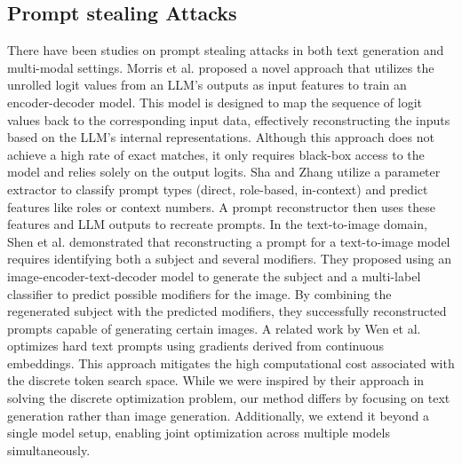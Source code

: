 \subsection{Prompt stealing Attacks}
There have been studies on prompt stealing attacks in both text generation and multi-modal settings. Morris et al. \cite{morris_language_nodate} proposed a novel approach that utilizes the unrolled logit values from an LLM's outputs as input features to train an encoder-decoder model. This model is designed to map the sequence of logit values back to the corresponding input data, effectively reconstructing the inputs based on the LLM's internal representations. Although this approach does not achieve a high rate of exact matches, it only requires black-box access to the model and relies solely on the output logits. Sha and Zhang \cite{sha_prompt_2024} utilize a parameter extractor to classify prompt types (direct, role-based, in-context) and predict features like roles or context numbers. A prompt reconstructor then uses these features and LLM outputs to recreate prompts. In the text-to-image domain, Shen et al.\cite{shen_prompt_nodate} demonstrated that reconstructing a prompt for a text-to-image model requires identifying both a subject and several modifiers. They proposed using an image-encoder-text-decoder model to generate the subject and a multi-label classifier to predict possible modifiers for the image. By combining the regenerated subject with the predicted modifiers, they successfully reconstructed prompts capable of generating certain images. A related work by Wen et al.\cite{wen_hard_2023} optimizes hard text prompts using gradients derived from continuous embeddings. This approach mitigates the high computational cost associated with the discrete token search space. While we were inspired by their approach in solving the discrete optimization problem, our method differs by focusing on text generation rather than image generation. Additionally, we extend it beyond a single model setup, enabling joint optimization across multiple models simultaneously.